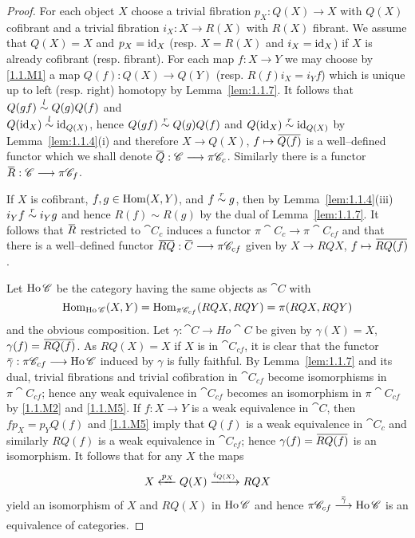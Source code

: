 \documentclass[../main]{subfiles}
\begin{document}
\begin{proof}
For each object $X$ choose a trivial fibration $p_X : Q(X) \longrightarrow X$ with $Q(X)$ cofibrant and a trivial fibration $i_X : X \longrightarrow R(X)$ with $R(X)$ fibrant. We assume that $Q(X) = X$ and $p_X = \operatorname{id}_X$ (resp. $X = R(X)$ and $i_X = \operatorname{id}_X$) if $X$ is already cofibrant (resp. fibrant). For each map $f : X \longrightarrow Y$ we may choose by \ref{1.1.M1} a map $Q(f) : Q(X) \longrightarrow Q(Y)$ (resp. $R(f) i_X = i_Y f$) which is unique up to left (resp. right) homotopy by Lemma~\ref{lem:1.1.7}. It follows that $Q(gf) \overset{l}{\sim} Q(g) Q(f)$ and \\ $Q(\operatorname{id}_X) \overset{l}{\sim} \operatorname{id}_{Q(X)}$, hence $Q(gf) \overset{r}{\sim} Q(g) Q(f)$ and $Q(\operatorname{id}_X) \overset{r}{\sim} \operatorname{id}_{Q(X)}$ by Lemma~\ref{lem:1.1.4}(i) and therefore $X \longrightarrow Q(X)$, $f \mapsto \xoverline {Q(f)}$ is a well--defined functor which we shall denote $\xoverline Q : \cat C \longrightarrow \pi \cat C_c$. Similarly there is a functor $\xoverline R : \cat C \longrightarrow \pi \cat C_f$. 

If $X$ is cofibrant, $f, g \in \operatorname{Hom}(X, Y)$, and $f \overset{r}{\sim} g$, then by Lemma~\ref{lem:1.1.4}(iii) $i_Y f \overset{r}{\sim} i_Y g$ and hence $R(f) \sim R(g)$ by the dual of Lemma~\ref{lem:1.1.7}. It follows that $\xoverline R$ restricted to $\cat C_c$ induces a functor $\pi \cat C_c \longrightarrow \pi \cat C_{cf}$ and that there is a well--defined functor $\xoverline {RQ} : \xoverline C \longrightarrow \pi \cat C_{cf}$ given by $X \longrightarrow RQX$, $f \mapsto \xoverline {RQ(f)}$.

Let $\operatorname{Ho} \mathscr{C}$ be the category having the same objects as $\cat C$ with \[\operatorname{Hom}_{\operatorname{Ho} \mathscr{C}}(X, Y) = \operatorname{Hom}_{\pi \mathscr{C}_{cf}}(RQX, RQY) = \pi(RQX, RQY)\]
and the obvious composition. Let $\gamma : \cat C \longrightarrow Ho \cat C$ be given by $\gamma(X) = X$, $\gamma(f) = \xoverline {RQ(f)}$. As $RQ(X) = X$ if $X$ is in $\cat C_{cf}$, it is clear that the functor $\xoverline \gamma : \pi \cat C_{cf} \longrightarrow \Ho \cat C$ induced by $\gamma$ is fully faithful. By Lemma~\ref{lem:1.1.7} and its dual, trivial fibrations and trivial cofibration in $\cat C_{cf}$ become isomorphisms in $\pi \cat C_{cf}$; hence any weak equivalence in $\cat C_{cf}$ becomes an isomorphism in $\pi \cat C_{cf}$ by \ref{1.1.M2} and \ref{1.1.M5}. If $f : X \longrightarrow Y$ is a weak equivalence in $\cat C$, then $f p_X = p_Y Q(f)$ and \ref{1.1.M5} imply that $Q(f)$ is a weak equivalence in $\cat C_c$ and similarly $RQ(f)$ is a weak equivalence in $\cat C_{cf}$; hence $\gamma(f) = \xoverline {RQ(f)}$ is an isomorphism. It follows that for any $X$ the maps \[X \xleftarrow{p_X} Q(X) \varrightarrow{i_{Q(X)}} RQX\] yield an isomorphism of $X$ and $RQ(X)$ in $\operatorname{Ho} \mathscr{C}$ and hence $\pi \cat C_{cf} \varrightarrow{\xoverline \gamma} \Ho \cat C$ is an equivalence of categories. 


\end{proof}
\end{document}
